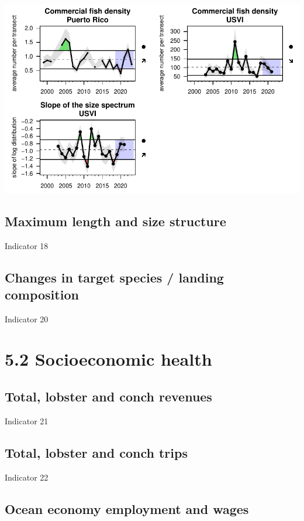 \documentclass[
  letterpaper,
  oneside,
  open=any]{scrbook}
\begin{document}
\includegraphics{Report_book_files/Performance_indicators_files/figure-pdf/unnamed-chunk-4-1.pdf}

\subsection{Maximum length and size
structure}\label{maximum-length-and-size-structure}

Indicator 18

\subsection{Changes in target species / landing
composition}\label{changes-in-target-species-landing-composition}

Indicator 20

\section{5.2 Socioeconomic health}\label{socioeconomic-health}

\subsection{Total, lobster and conch
revenues}\label{total-lobster-and-conch-revenues}

Indicator 21

\subsection{Total, lobster and conch
trips}\label{total-lobster-and-conch-trips}

Indicator 22

\subsection{Ocean economy employment and
wages}\label{ocean-economy-employment-and-wages}
\end{document}
